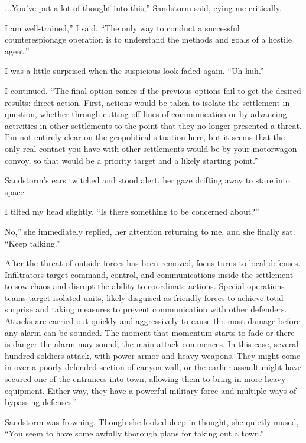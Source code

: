 \leavevmode{}...You’ve put a lot of thought into this,” Sandstorm said, eying me critically.

\leavevmode{}I am well-trained,” I said. “The only way to conduct a successful counterespionage operation is to understand the methods and goals of a hostile agent.”

I was a little surprised when the suspicious look faded again. “Uh-huh.”

I continued. “The final option comes if the previous options fail to get the desired results: direct action. First, actions would be taken to isolate the settlement in question, whether through cutting off lines of communication or by advancing activities in other settlements to the point that they no longer presented a threat. I’m not entirely clear on the geopolitical situation here, but it seems that the only real contact you have with other settlements would be by your motorwagon convoy, so that would be a priority target and a likely starting point.”

Sandstorm’s ears twitched and stood alert, her gaze drifting away to stare into space.

I tilted my head slightly. “Is there something to be concerned about?”

\leavevmode{}No,” she immediately replied, her attention returning to me, and she finally sat. “Keep talking.”

\leavevmode{}After the threat of outside forces has been removed, focus turns to local defenses. Infiltrators target command, control, and communications inside the settlement to sow chaos and disrupt the ability to coordinate actions. Special operations teams target isolated units, likely disguised as friendly forces to achieve total surprise and taking measures to prevent communication with other defenders. Attacks are carried out quickly and aggressively to cause the most damage before any alarm can be sounded. The moment that momentum starts to fade or there is danger the alarm may sound, the main attack commences. In this case, several hundred soldiers attack, with power armor and heavy weapons. They might come in over a poorly defended section of canyon wall, or the earlier assault might have secured one of the entrances into town, allowing them to bring in more heavy equipment. Either way, they have a powerful military force and multiple ways of bypassing defenses.”

Sandstorm was frowning. Though she looked deep in thought, she quietly mused, “You seem to have some awfully thorough plans for taking out a town.”

